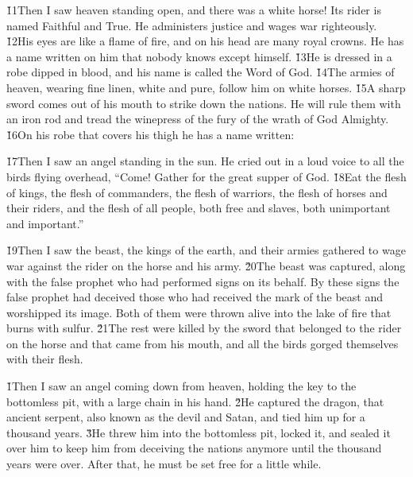 \v{11}Then I saw heaven standing open, and there was a white horse! Its rider is named Faithful and True. He administers justice and wages war righteously. \v{12}His eyes are like a flame of fire, and on his head are many royal crowns. He has a name written on him that nobody knows except himself. \v{13}He is dressed in a robe dipped in blood, and his name is called the Word of God. \v{14}The armies of heaven, wearing fine linen, white and pure, follow him on white horses. \v{15}A sharp sword comes out of his mouth to strike down the nations. He will rule them with an iron rod and tread the winepress of the fury of the wrath of God Almighty. \v{16}On his robe that covers his thigh he has a name written:


\v{17}Then I saw an angel standing in the sun. He cried out in a loud voice to all the birds flying overhead, ``Come! Gather for the great supper of God. \v{18}Eat the flesh of kings, the flesh of commanders, the flesh of warriors, the flesh of horses and their riders, and the flesh of all people, both free and slaves, both unimportant and important.''

\v{19}Then I saw the beast, the kings of the earth, and their armies gathered to wage war against the rider on the horse and his army. \v{20}The beast was captured, along with the false prophet who had performed signs on its behalf. By these signs the false prophet had deceived those who had received the mark of the beast and worshipped its image. Both of them were thrown alive into the lake of fire that burns with sulfur. \v{21}The rest were killed by the sword that belonged to the rider on the horse and that came from his mouth, and all the birds gorged themselves with their flesh.

\v{1}Then I saw an angel coming down from heaven, holding the key to the bottomless pit, with a large chain in his hand. \v{2}He captured the dragon, that ancient serpent, also known as the devil and Satan, and tied him up for a thousand years. \v{3}He threw him into the bottomless pit, locked it, and sealed it over him to keep him from deceiving the nations anymore until the thousand years were over. After that, he must be set free for a little while.

